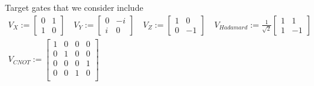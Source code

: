 \documentclass[letterpaper]{article}
\begin{document}
Target gates that we consider include
    \begin{align}
      V_{X} := \begin{bmatrix} 0 & 1 \\ 1 & 0  \end{bmatrix} \quad
      V_{Y} := \begin{bmatrix} 0 & -i \\ i & 0 \end{bmatrix} \quad
      V_{Z} := \begin{bmatrix} 1 & 0 \\ 0 & -1 \end{bmatrix} \quad 
      V_{Hadamard} := \frac{1}{\sqrt{2}} \begin{bmatrix} 1 & 1 \\ 1 & -1 \end{bmatrix} \\
      V_{CNOT} := \begin{bmatrix} 1  & 0 & 0 & 0 \\ 
                                   0  & 1 & 0 & 0 \\ 
                                   0  & 0 & 0 & 1 \\ 
                                   0  & 0 & 1 & 0 \\ 
                    \end{bmatrix}
    \end{align}

\end{document}
